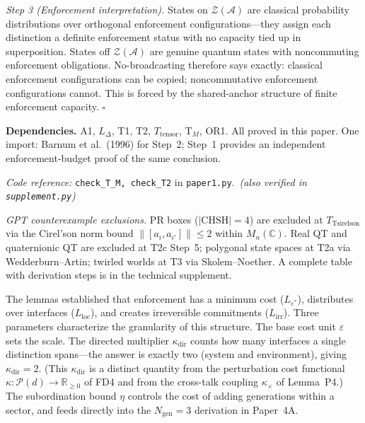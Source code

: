 \documentclass[11pt]{article}
\theoremstyle{remark}
\newcommand{\coderef}[2]{\smallskip\noindent\textit{Code reference:} \texttt{#1} in \texttt{#2}.}
\begin{document}
\begin{tcolorbox}[apfbox, title={Theorem $T_{\mathrm{NB}}$ (No-Broadcasting)}]
\textit{Step 3 (Enforcement interpretation).}  States on $\mathcal{Z}(\mathcal{A})$ are classical probability distributions over orthogonal enforcement configurations---they assign each distinction a definite enforcement status with no capacity tied up in superposition.  States off $\mathcal{Z}(\mathcal{A})$ are genuine quantum states with noncommuting enforcement obligations.  No-broadcasting therefore says exactly: classical enforcement configurations can be copied; noncommutative enforcement configurations cannot.  This is forced by the shared-anchor structure of finite enforcement capacity.  \hfill$\square$

\smallskip\noindent\textbf{Dependencies.}  A1, $L_\Delta$, T1, T2, $T_{\mathrm{tensor}}$, T$_M$, OR1.  All proved in this paper.  One import: Barnum et al.\ (1996) for Step~2; Step~1 provides an independent enforcement-budget proof of the same conclusion.

\coderef{check\_T\_M, check\_T2}{paper1.py}\,%
\hspace{1em}\textit{(also verified in \texttt{supplement.py})}
\end{tcolorbox}

\smallskip\noindent\textit{GPT counterexample exclusions.}  PR boxes ($|\mathrm{CHSH}| = 4$) are excluded at $T_{\mathrm{Tsirelson}}$ via the Cirel'son norm bound $\|[a_i,a_{i'}]\| \le 2$ within $M_n(\mathbb{C})$.  Real QT and quaternionic QT are excluded at T2c Step~5; polygonal state spaces at T2a via Wedderburn--Artin; twirled worlds at T3 via Skolem--Noether.  A complete table with derivation steps is in the technical supplement.

The lemmas established that enforcement has a minimum cost ($L_{\varepsilon^*}$), distributes over interfaces ($L_{\mathrm{loc}}$), and creates irreversible commitments ($L_{\mathrm{irr}}$).  Three parameters characterize the granularity of this structure.  The base cost unit $\varepsilon$ sets the scale.  The directed multiplier $\kappa_{\mathrm{dir}}$ counts how many interfaces a single distinction spans---the answer is exactly two (system and environment), giving $\kappa_{\mathrm{dir}} = 2$.  (This $\kappa_{\mathrm{dir}}$ is a distinct quantity from the perturbation cost functional $\kappa: \mathcal{P}(d) \to \mathbb{R}_{\ge 0}$ of FD4 and from the cross-talk coupling $\kappa_\times$ of Lemma~P4.)  The subordination bound $\eta$ controls the cost of adding generations within a sector, and feeds directly into the $N_{\mathrm{gen}} = 3$ derivation in Paper~4A.
\end{document}
